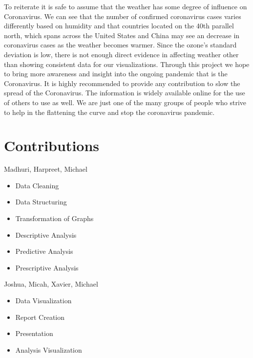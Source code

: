 \documentclass[10pt,journal,compsoc]{IEEEtran}
\begin{document}
{{{	To reiterate it is safe to assume that the weather has some degree of influence on Coronavirus. We can see that the number of confirmed coronavirus cases varies differently based on humidity and that countries located on the 40th parallel north, which spans across the United States and China may see an decrease in coronavirus cases as the weather becomes warmer. Since the ozone’s standard deviation is low, there is not enough direct evidence in affecting weather other than showing consistent data for our visualizations.	
	Through this project we hope to bring more awareness and insight into the ongoing pandemic that is the Coronavirus. It is highly recommended to provide any contribution to slow the spread of the Coronavirus. The information is widely available online for the use of others to use as well. We are just one of the many groups of people who strive to help in the flattening the curve and stop the coronavirus pandemic.

\ifCLASSOPTIONcompsoc
\section*{Contributions}
Madhuri, Harpreet, Michael 
\begin{itemize}
	\item Data Cleaning  
	
	\item Data Structuring

	\item Transformation of Graphs

	\item Descriptive Analysis

	\item Predictive Analysis

	\item Prescriptive Analysis
\end{itemize}
Joshua, Micah, Xavier, Michael
\begin{itemize}
	\item Data Visualization
	
	\item Report Creation
	
	\item Presentation

	\item Analysis Visualization 
\end{itemize}
\ifCLASSOPTIONcompsoc
}}}
\end{document}
